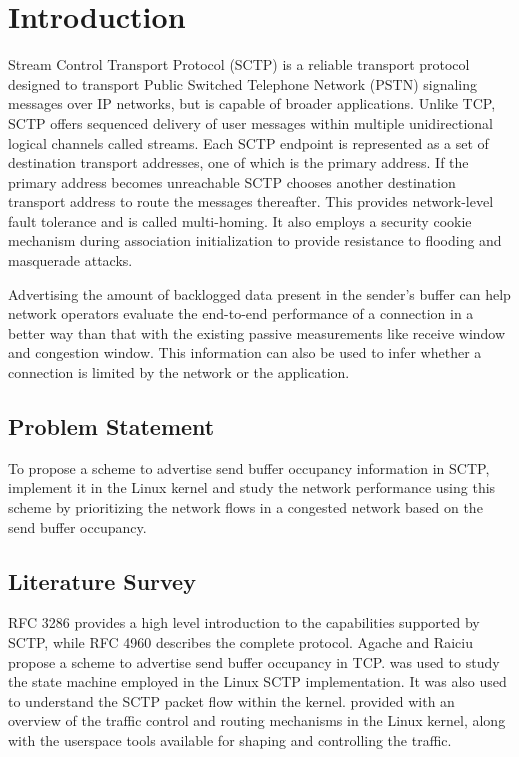 \chapter{Introduction}
Stream Control Transport Protocol (SCTP) is a reliable transport protocol
designed to transport Public Switched Telephone Network (PSTN) signaling
messages over IP networks, but is capable of broader applications.
Unlike TCP, SCTP offers sequenced delivery of user messages within multiple
unidirectional logical channels called streams.
Each SCTP endpoint is represented as a set of destination transport addresses,
one of which is the primary address. If the primary address becomes unreachable
SCTP chooses another destination transport address to route the messages
thereafter. This provides network-level fault tolerance and is called
multi-homing.
It also employs a security cookie mechanism during association initialization
to provide resistance to flooding and masquerade attacks.

Advertising the amount of backlogged data present in the sender's buffer can
help network operators evaluate the end-to-end performance of a connection
in a better way than that with the existing passive measurements like
receive window and congestion window.
This information can also be used to infer whether a connection is limited
by the network or the application.

\section{Problem Statement}
To propose a scheme to advertise send buffer occupancy information in SCTP,
implement it in the Linux kernel and study the network performance using this
scheme by prioritizing the network flows in a congested network based on the
send buffer occupancy.

\section{Literature Survey}
RFC 3286 \cite{rfc3286} provides a high level introduction to the capabilities
supported by SCTP, while RFC 4960 \cite{rfc4960} describes the complete
protocol. Agache and Raiciu \cite{tcp-sndbufadv} propose a scheme to advertise
send buffer occupancy in TCP. \cite{budigerelinux} was used to study the state
machine employed in the Linux SCTP implementation. It was also used to
understand the SCTP packet flow within the kernel. \cite{lartc} provided with
an overview of the traffic control and routing mechanisms in the Linux kernel,
along with the userspace tools available for shaping and controlling the
traffic.
